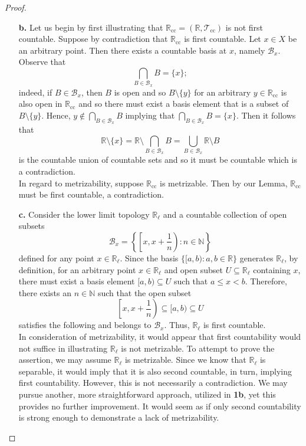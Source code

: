\documentclass[ 12pt ]{article}
\begin{document}
\begin{enumerate}
\begin{proof}
\begin{enumerate}
				\item[\textbf{b.}] Let us begin by first illustrating that $\mathbb{R}_\mathrm{cc} = (\mathbb{R}, \mathcal{T}_\mathrm{cc})$ is not first countable. Suppose by
					contradiction that $\mathbb{R}_\mathrm{cc}$ is first countable. Let $x \in X$ be an arbitrary point. Then there exists a countable basis at $x$, namely $\mathcal{B}_x$.
					Observe that $$\bigcap_{B \in \mathcal{B}_x} B = \{ x \};$$ indeed, if $B \in \mathcal{B}_x$, then $B$ is open and so $B \setminus \{ y \}$ for an arbitrary $y \in
					\mathbb{R}_\mathrm{cc}$ is also open in $\mathbb{R}_\mathrm{cc}$ and so there must exist a basis element that is a subset of $B \setminus \{ y \}$. Hence, $y \notin
					\bigcap_{B \in \mathcal{B}_x} B$ implying that $\bigcap_{B \in \mathcal{B}_x} B = \{ x \}$. Then it follows that $$\mathbb{R} \setminus \{ x \} = \mathbb{R} \setminus
					\bigcap_{B \in \mathcal{B}_x} B = \bigcup_{B \in \mathcal{B}_x} \mathbb{R} \setminus B$$ is the countable union of countable sets and so it must be countable which is a
					contradiction. \\

					In regard to metrizability, suppose $\mathbb{R}_\mathrm{cc}$ is metrizable. Then by our Lemma, $\mathbb{R}_\mathrm{cc}$ must be first countable, a contradiction.

				\item[\textbf{c.}] Consider the lower limit topology $\mathbb{R}_\ell$ and a countable collection of open subsets $$\mathcal{B}_x = \left \{ \left [ x, x + \frac{1}{n}
					\right ) : n \in \mathbb{N} \right \}$$ defined for any point $x \in \mathbb{R}_\ell$. Since the basis $\{ [a, b) : a, b \in \mathbb{R} \}$ generates
					$\mathbb{R}_\ell$, by definition, for an arbitrary point $x \in \mathbb{R}_\ell$ and open subset $U \subseteq \mathbb{R}_\ell$ containing $x$, there must exist
					a basis element $[a, b) \subseteq U$ such that $a \leq x < b$. Therefore, there exists an $n \in \mathbb{N}$ such that the open subset $$\left [ x, x + \frac{1}{n}
					\right ) \subseteq [a, b) \subseteq U$$ satisfies the following and belongs to $\mathcal{B}_x$. Thus, $\mathbb{R}_\ell$ is first countable. \\

					In consideration of metrizability, it would appear that first countability would not suffice in illustrating $\mathbb{R}_\ell$ is not metrizable. To attempt to prove
					the assertion, we may assume $\mathbb{R}_\ell$ is metrizable. Since we know that $\mathbb{R}_\ell$ is separable, it would imply that it is also second countable, in
					turn, implying first countability. However, this is not necessarily a contradiction. We may pursue another, more straightforward approach, utilized in \textbf{1b},
					yet this provides no further improvement. It would seem as if only second countability is strong enough to demonstrate a lack of metrizability.


\end{enumerate}
\end{proof}
\end{enumerate}
\end{document}
